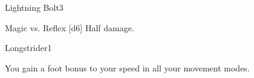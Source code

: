 \begin{spellsection}{Lightning Bolt}{3}
    \begin{spellheader}
    \end{spellheader}
    \begin{spellcontent}
        \begin{spelltargetinginfo}
        \end{spelltargetinginfo}
        \begin{spelleffects}
            \begin{spellattack}{Magic vs. Reflex}
                \spellsuccess {}[d6]
                \spellfailure Half damage.
            \end{spellattack}
        \end{spelleffects}
    \end{spellcontent}
    \begin{spellfooter}
        \spellnotes \destructivespellnotes
        \miscastexplode
    \end{spellfooter}
\end{spellsection}

\begin{spellsection}{Longstrider}{1}
    \begin{spellheader}
    \end{spellheader}
    \begin{spellcontent}
        \begin{spelltargetinginfo}
        \end{spelltargetinginfo}
        \begin{spelleffects}
            \spelleffect You gain a  foot bonus to your speed in all your movement modes.
            \spelldur \durlong \dismissable
        \end{spelleffects}
    \end{spellcontent}
    \begin{spellfooter}
        \miscastexplode
    \end{spellfooter}
\end{spellsection}


